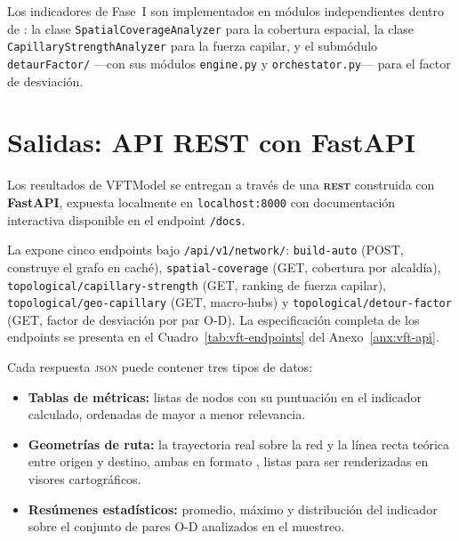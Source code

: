Los indicadores de Fase~I son implementados en módulos independientes dentro de
: la clase
\texttt{SpatialCoverageAnalyzer} para la cobertura espacial, la clase
\texttt{CapillaryStrengthAnalyzer} para la fuerza capilar, y el submódulo
\texttt{detaurFactor/} —con sus módulos \texttt{engine.py} y
\texttt{orchestator.py}— para el factor de desviación.

\section{Salidas: API REST con FastAPI}
\label{sec:vft-salidas}

Los resultados de VFTModel se entregan a través de una \textbf{\api{} \textsc{rest}}
construida con \textbf{FastAPI}, expuesta localmente en \texttt{localhost:8000}
con documentación interactiva disponible en el endpoint \texttt{/docs}.

La \api{} expone cinco endpoints bajo \texttt{/api/v1/network/}: \texttt{build-auto} (POST, construye el grafo en caché), \texttt{spatial-coverage} (GET, cobertura por alcaldía), \texttt{topological/capillary-strength} (GET, ranking de fuerza capilar), \texttt{topological/geo-capillary} (GET, macro-hubs) y \texttt{topological/detour-factor} (GET, factor de desviación por par O-D). La especificación completa de los endpoints se presenta en el Cuadro~\ref{tab:vft-endpoints} del Anexo~\ref{anx:vft-api}.

Cada respuesta \textsc{json} puede contener tres tipos de datos:

\begin{itemize}
    \item \textbf{Tablas de métricas:} listas de nodos con su puntuación en el
    indicador calculado, ordenadas de mayor a menor relevancia.
    \item \textbf{Geometrías de ruta:} la trayectoria real sobre la red y la
    línea recta teórica entre origen y destino, ambas en formato \geojson{},
    listas para ser renderizadas en visores cartográficos.
    \item \textbf{Resúmenes estadísticos:} promedio, máximo y distribución del
    indicador sobre el conjunto de pares O-D analizados en el muestreo.
\end{itemize}

